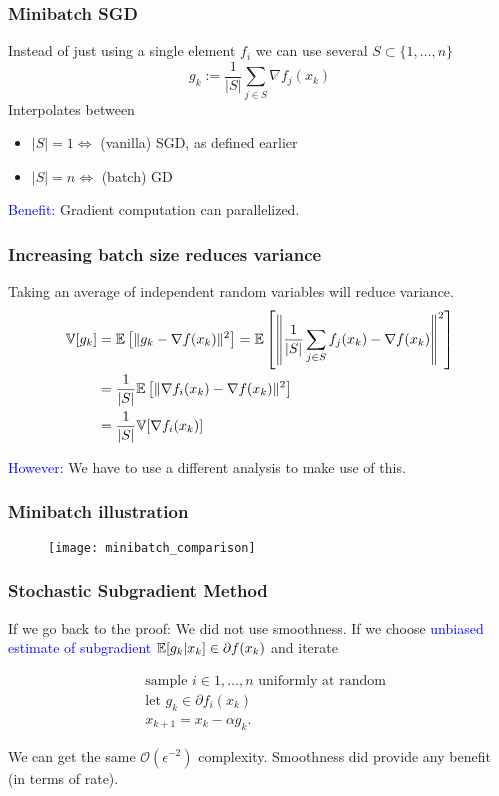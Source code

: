 \documentclass[aspectratio=149]{beamer}
\begin{document}
\begin{frame}
  \frametitle{Minibatch SGD}
  Instead of just using a single element $f_i$ we can use several $S \subset \{1, \dots, n\}$
  \begin{equation}
    g_k := \frac{1}{\vert S \vert} \sum_{j\in S} \nabla f_j(x_k)
  \end{equation}
  Interpolates between
  \begin{itemize}
    \item $\vert S \vert=1 \Leftrightarrow $ (vanilla) SGD, as defined earlier
    \item $\vert S \vert= n \Leftrightarrow$ (batch) GD
  \end{itemize}

  \textcolor{blue}{Benefit:} Gradient computation can parallelized.

\end{frame}


\begin{frame}
  \frametitle{Increasing batch size reduces variance}

  Taking an average of independent random variables will reduce variance.
  \begin{align}
    \mathbb{V}[g_k] &= \mathbb{E} \left[ \Vert g_k - \nabla f(x_k) \Vert^2 \right] = \mathbb{E} \left[ \left\Vert \frac{1}{\vert S \vert} \sum_{j\in S} f_j(x_k) - \nabla f(x_k) \right\Vert^2 \right] \\
              &= \frac{1}{\vert S \vert} \mathbb{E} \left[\Vert \nabla f_i(x_k) - \nabla f(x_k) \Vert^2\right] \\
    &= \frac{1}{\vert S \vert} \mathbb{V}[ \nabla f_i(x_k) ]
  \end{align}

  \textcolor{blue}{However:} We have to use a different analysis to make use of this.
\end{frame}


\begin{frame}
  \frametitle{Minibatch illustration}
  \begin{figure}[ht]
    \centering
    \texttt{[image: minibatch\_comparison]}
  \end{figure}
\end{frame}


\begin{frame}
  \frametitle{Stochastic Subgradient Method}
  If we go back to the proof: We did not use smoothness. If we choose \textcolor{blue}{unbiased estimate of subgradient} $\mathbb{E}[g_k|x_k] \in \partial f(x_k)$ and iterate
  \begin{block}{}
    \begin{align}
      &\text{sample $i\in 1,\dots, n$ uniformly at random} \\
      &\text{let $g_k \in \partial f_i(x_k)$}\\
      &x_{k+1} = x_k - \alpha g_k.
    \end{align}
  \end{block}
  We can get the same $\mathcal{O}(\epsilon^{-2})$ complexity. Smoothness did provide any benefit (in terms of rate).
\end{frame}
\end{document}
